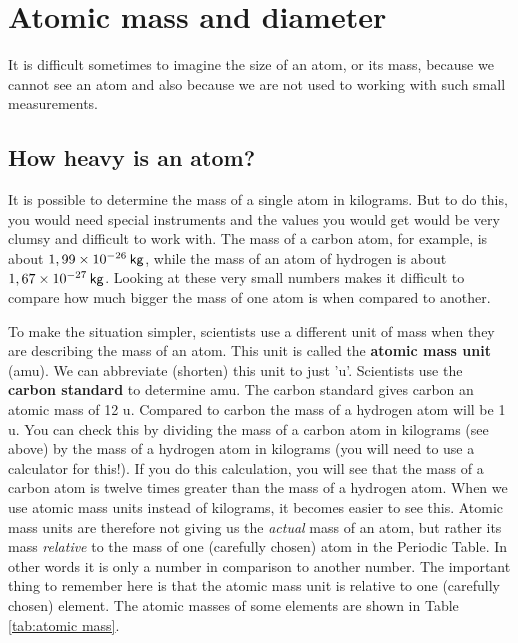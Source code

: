             \section{Atomic mass and diameter}
            \nopagebreak
            \label{m38756*id254850}It is difficult sometimes to imagine the size of an atom, or its mass, because we cannot see an atom and also because we are not used to working with such small measurements.\par 
      \label{m38756*uid7}
            \subsection*{How heavy is an atom?}
            \nopagebreak
        \label{m38756*id254863}It is possible to determine the mass of a single atom in kilograms. But to do this, you would need special instruments and the values you would get would be very clumsy and difficult to work with. The mass of a carbon atom, for example, is about $1,99\ensuremath{\times}{10}^{-26}\phantom{\rule{2pt}{0ex}}\mathsf{kg}$, while the mass of an atom of hydrogen is about $1,67\ensuremath{\times}{10}^{-27}\phantom{\rule{2pt}{0ex}}\mathsf{kg}$. Looking at these very small numbers makes it difficult to compare how much bigger the mass of one atom is when compared to another.\par 
        \label{m38756*id254908}To make the situation simpler, scientists use a different unit of mass when they are describing the mass of an atom. This unit is called the \textbf{atomic mass unit} (amu). We can abbreviate (shorten) this unit to just 'u'. Scientists use the \textbf{carbon standard} to determine amu. The carbon standard gives carbon an atomic mass of 12 u. Compared to carbon the mass of a hydrogen atom will be 1 u. You can check this by dividing the mass of a carbon atom in kilograms (see above) by the mass of a hydrogen atom in kilograms (you will need to use a calculator for this!). If you do this calculation, you will see that the mass of a carbon atom is twelve times greater than the mass of a hydrogen atom. When we use atomic mass units instead of kilograms, it becomes easier to see this. Atomic mass units are therefore not giving us the \textsl{actual} mass of an atom, but rather its mass \textsl{relative} to the mass of one (carefully chosen) atom in the Periodic Table. In other words it is only a number in comparison to another number. The important thing to remember here is that the atomic mass unit is relative to one (carefully chosen) element. The atomic masses of some elements are shown in Table \ref{tab:atomic mass}.

